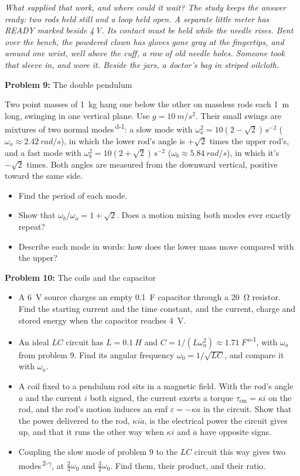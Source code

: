\documentclass[11pt]{article}
\newcommand{\room}[1]{\par\bigskip{\large\bfseries #1}\par\nopagebreak\smallskip}
\newcommand{\scene}[1]{\par{\itshape #1}\par}
\newcommand{\problem}[2]{\par\medskip\textbf{Problem #1:} #2\par\nopagebreak}
\newenvironment{parts}{\begin{itemize}[leftmargin=3.4em,labelwidth=2.8em,labelsep=0.6em,align=left,itemsep=2pt,topsep=3pt]}{\end{itemize}}
\newcommand{\pt}[1]{\item[\textbf{#1}]}
\newcommand{\sv}[1]{\textsuperscript{\dag\,#1}}
\begin{document}
\room{Study}
\scene{What supplied that work, and where could it wait? The study keeps the answer ready: two rods held still and a loop held open. A separate little meter has READY marked beside 4\,V. Its contact must be held while the needle rises. Bent over the bench, the powdered clown has gloves gone gray at the fingertips, and around one wrist, well above the cuff, a row of old needle holes. Someone took that sleeve in, and wore it. Beside the jars, a doctor's bag in striped oilcloth.}
\problem{9}{The double pendulum}
Two point masses of \SI{1}{kg} hang one below the other on massless rods each \SI{1}{m} long, swinging in one vertical plane. Use $g = \SI{10}{m/s^2}$. Their small swings are mixtures of two normal modes\sv{d-1}: a slow mode with $\omega_a^2 = 10(2 - \sqrt2)\,\mathrm{s^{-2}}$ ($\omega_a \approx \SI{2.42}{rad/s}$), in which the lower rod's angle is $+\sqrt2$ times the upper rod's, and a fast mode with $\omega_b^2 = 10(2 + \sqrt2)\,\mathrm{s^{-2}}$ ($\omega_b \approx \SI{5.84}{rad/s}$), in which it's $-\sqrt2$ times. Both angles are measured from the downward vertical, positive toward the same side.
\begin{parts}
\pt{9-a} Find the period of each mode.
\pt{9-b} Show that $\omega_b/\omega_a = 1 + \sqrt2$. Does a motion mixing both modes ever exactly repeat?
\pt{9-c} Describe each mode in words: how does the lower mass move compared with the upper?
\end{parts}

\problem{10}{The coils and the capacitor}
\begin{parts}
\pt{10-a} A \SI{6}{V} source charges an empty \SI{0.1}{F} capacitor through a \SI{20}{\ohm} resistor. Find the starting current and the time constant, and the current, charge and stored energy when the capacitor reaches \SI{4}{V}.
\pt{10-b} An ideal $LC$ circuit has $L = \SI{0.1}{H}$ and $C = 1/(L\omega_a^2) \approx \SI{1.71}{F}$\sv{e-1}, with $\omega_a$ from problem 9. Find its angular frequency $\omega_0 = 1/\sqrt{LC}$, and compare it with $\omega_a$.
\pt{10-c} A coil fixed to a pendulum rod sits in a magnetic field. With the rod's angle $a$ and the current $i$ both signed, the current exerts a torque $\tau_{\mathrm{em}} = \kappa i$ on the rod, and the rod's motion induces an emf $\varepsilon = -\kappa\dot a$ in the circuit. Show that the power delivered to the rod, $\kappa i\dot a$, is the electrical power the circuit gives up, and that it runs the other way when $\kappa i$ and $\dot a$ have opposite signs.
\pt{10-d} Coupling the slow mode of problem 9 to the $LC$ circuit this way gives two modes\sv{2-$\gamma$}, at $\frac23\omega_0$ and $\frac32\omega_0$. Find them, their product, and their ratio.
\end{parts}
\end{document}
